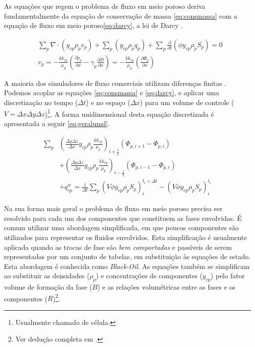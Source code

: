 \documentclass[final,5p]{elsarticle}
\numberwithin{equation}{section}
\begin{document}
        As equações que regem o problema de fluxo em meio poroso deriva fundamentalmente da equação de conservação de massa \ref{eq:consmassa} com a equação de fluxo em meio poroso\ref{eq:darcy}, a lei de Darcy \cite{dake1983fundamentals}.

        \begin{align}
            &\sum_{p} \nabla \cdot  (y_{cp} \rho_p v_p) + \sum_{p} (y_{cp} \rho_p q_p) + \sum_{p} \frac{\partial}{\partial t} \left( \phi y_{cp} \rho_p S_p\right) = 0 \label{eq:consmassa} \\
            &v_p = - \frac{k k_{rp}}{\mu_p} \left( \frac{\partial p_p}{\partial x} - \gamma_p \frac{\partial D}{\partial x} \right) = - \frac{k k_{rp}}{\mu_p} \left( \frac{\partial \Phi_p}{\partial x} \right)\label{eq:darcy}
        \end{align}

        A maioria dos simuladores de fluxo comerciais utilizam diferenças finitas \cite{computer2022cmg}\cite{schlumberger2009technical}. Podemos acoplar as equações \ref{eq:consmassa} e \ref{eq:darcy}, e aplicar uma discretização no tempo ($\Delta t$) e no espaço ($\Delta x$) para um volume de controle ($V = \Delta x \Delta y \Delta z$)\footnote{Usualmente chamado de célula.}. A forma unidimensional desta equação discretizada é apresentada a seguir \ref{eq:geralumd}.

        \begin{align}
            \sum_{p} & \left( \frac{\Delta y \Delta z}{\Delta x} y_{cp} \rho_p \frac{k k_{rp}}{\mu_p} \right)_{i+\tfrac{1}{2}} (\Phi_{p,i+1} - \Phi_{p,i})  \nonumber \\
            & + \left( \frac{\Delta y \Delta z}{\Delta x} y_{cp} \rho_p \frac{k k_{rp}}{\mu_p} \right)_{i-\tfrac{1}{2}} (\Phi_{p,i-1} - \Phi_{p,i}) \nonumber \\
            & + q_{cp}^{w} = \frac{1}{\Delta t} \sum_{p} (V \phi y_{cp} \rho_p S_p)_i^{t_i+\Delta t} - (V \phi y_{cp} \rho_p S_p)_i^{t_i} \label{eq:geralumd}
        \end{align}

        Na sua forma mais geral o problema de fluxo em meio poroso precisa ser resolvido para cada um dos componentes que constituem as fases envolvidas. É comum utilizar uma abordagem simplificada, em que poucos componentes são utilizados para representar os fluidos envolvidos. Esta simplificação é usualmente aplicada quando as trocas de fase são \emph{bem comportadas} e passíveis de serem representadas por um conjunto de tabelas, em substituição às equações de estado. Esta abordagem é conhecida como \emph{Black-Oil}. As equações também se simplificam ao substituir as densidades ($\rho_p$) e concentrações de componentes ($y_{cp}$) pelo fator volume de formação da fase ($B$) e as relações volumétricas entre as fases e os componentes ($R$)\footnote{Ver dedução completa em \cite{dake1983fundamentals}.}.
\end{document}
